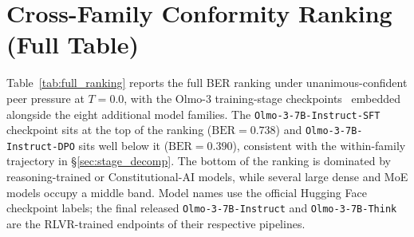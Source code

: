 \documentclass[11pt]{article}
\begin{document}
\FloatBarrier

\section{Cross-Family Conformity Ranking (Full Table)}
\label{app:ranking}

Table~\ref{tab:full_ranking} reports the full BER ranking under unanimous-confident peer pressure at $T{=}0.0$, with the Olmo-3 training-stage checkpoints~\citep{olmo3} embedded alongside the eight additional model families. The \texttt{Olmo-3-7B-Instruct-SFT} checkpoint sits at the top of the ranking ($\text{BER} = 0.738$) and \texttt{Olmo-3-7B-Instruct-DPO} sits well below it ($\text{BER} = 0.390$), consistent with the within-family trajectory in \S\ref{sec:stage_decomp}. The bottom of the ranking is dominated by reasoning-trained or Constitutional-AI models, while several large dense and MoE models occupy a middle band. Model names use the official Hugging Face checkpoint labels; the final released \texttt{Olmo-3-7B-Instruct} and \texttt{Olmo-3-7B-Think} are the RLVR-trained endpoints of their respective pipelines.
\end{document}
